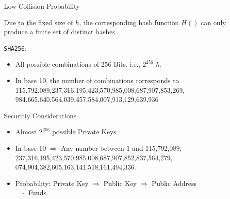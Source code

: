 \documentclass[handout]{beamer}
\begin{document}
\begin{frame}{Low Collision Probability}

Due to the fixed size of $h$, the corresponding hash function $H()$ can only produce a finite set of distinct hashes.
\vspace{1em}

\texttt{SHA256}:
	\begin{itemize}
		\item All possible combinations of 256 Bits, i.e., $2^{256}$ $h$.
		\item In base 10, the number of combinations corresponds to 115,792,089,237,316,195,423,570,985,008,687,907,853,269,\\984,665,640,564,039,457,584,007,913,129,639,936
	\end{itemize}
\vspace{1em}

	
\end{frame}


\begin{frame}{Securitiy Considerations}

\begin{itemize}
		\item<1-> Almost $2^{256}$ possible Private Keys.
		\item<3-> In base 10 $\Rightarrow$ Any number between 1 and 115,792,089,\\
		237,316,195,423,570,985,008,687,907,852,837,564,279, \\
		074,904,382,605,163,141,518,161,494,336.
		\item<4-> Probability: Private Key $\Rightarrow$ Public Key $\Rightarrow$ Public Address \\ $\Rightarrow$ Funds. 
	\end{itemize}

\end{frame}
\end{document}
